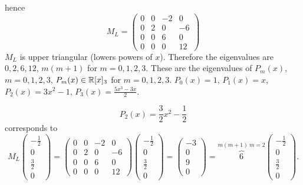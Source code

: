 \documentclass[10pt, a4paper]{article}
\begin{document}
hence
\[
M_L = \begin{pmatrix}
    0 & 0 & -2 & 0 \\
    0 & 2 & 0 & -6 \\
    0 & 0 & 6 & 0 \\
    0 & 0 & 0 & 12
\end{pmatrix}
\]
$M_L$ is upper triangular
(lowers powers of $x$).
Therefore the eigenvalues are $0, 2, 6, 12$,
$m(m + 1)$ for $m = 0, 1, 2, 3$.
These are the eigenvalues of $P_m(x)$,
$m = 0, 1, 2, 3$,
$P_m(x) \in \mathbb{R}[x]_3$ for $m = 0, 1, 2, 3$.
$P_0(x) = 1$,
$P_1(x) = x$,
$P_2(x) = 3x ^ 2 - 1$,
$P_3(x) = \frac{5x ^ 3 - 3x}{2}$.

\begin{example}
    \[
    P_2(x) = \frac{3}{2}x ^ 2 - \frac{1}{2}
    \]
    corresponds to
    \[
    M_L\begin{pmatrix}
        -\frac{1}{2} \\ 0 \\ \frac{3}{2} \\ 0
    \end{pmatrix} = \begin{pmatrix}
        0 & 0 & -2 & 0 \\
        0 & 2 & 0 & -6 \\
        0 & 0 & 6 & 0 \\
        0 & 0 & 0 & 12
    \end{pmatrix}\begin{pmatrix}
        -\frac{1}{2} \\ 0 \\ \frac{3}{2} \\ 0
    \end{pmatrix} = \begin{pmatrix}
        -3 \\ 0 \\ 9 \\ 0
    \end{pmatrix} = \overbrace{6}^{m(m + 1)\ m = 2}\begin{pmatrix}
        -\frac{1}{2} \\ 0 \\ \frac{3}{2} \\ 0
    \end{pmatrix}.
    \]
\end{example}
\end{document}
